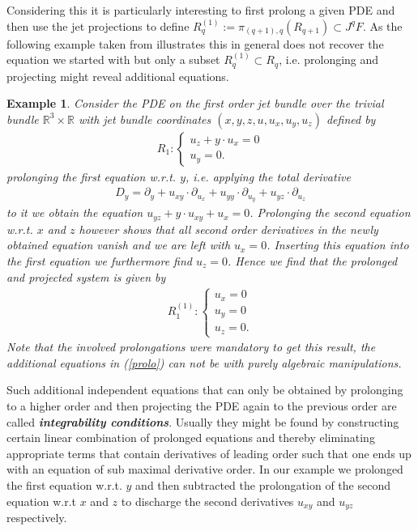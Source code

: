 \documentclass[a4paper,12pt, DIV=14, BCOR=5mm, twoside, headsepline]{scrbook}
\newtheorem{example}{Example}[chapter]
\begin{document}
Considering this it is particularly interesting to first prolong a given PDE and then use the jet projections to define $R_q^{(1)} := \pi_{(q+1),q}\left ( R_{q+1} \right ) \subset J^qF $. As the following example taken from \cite{seiler1994analysis} illustrates this in general does not recover the equation we started with but only a subset $R_q^{(1)} \subset R_q$, i.e. prolonging and projecting might reveal additional equations.
\begin{example}
Consider the PDE on the first order jet bundle over the trivial bundle $\mathbb{R}^3 \times \mathbb{R}$ with jet bundle  coordinates $(x,y,z,u,u_x,u_y,u_z)$ defined by 
\begin{align}
    R_1 : \begin{cases} u_z + y \cdot u_x = 0 \\
                        u_y = 0.
            \end{cases}
\end{align}
prolonging the first equation w.r.t. $y$, i.e. applying the total derivative 
\begin{align}
D_y = \partial_y + u_{xy} \cdot \partial_{u_x} + u_{yy} \cdot \partial_{u_y} + u_{yz} \cdot \partial_{u_z}
\end{align}
to it we obtain the equation $u_{yz} + y \cdot u_{xy} + u_x =0$. Prolonging the second equation w.r.t. $x$ and $z$ however shows that all second order derivatives in the newly obtained equation vanish and we are left with $u_x = 0$. Inserting this equation into the first equation we furthermore find $u_z = 0$. Hence we find that the prolonged and projected system is given by 
\begin{align}\label{prolo}
    R_1^{(1)} : \begin{cases} u_x = 0 \\
                        u_y = 0\\
                        u_z = 0 .
            \end{cases}
\end{align}
Note that the involved prolongations were mandatory to get this result, the additional equations in (\ref{prolo})  can not be with purely algebraic manipulations. 
\end{example}
Such additional independent equations that can only be obtained by prolonging to a higher order and then projecting the PDE again to the previous order are called \textit{\textbf{integrability conditions}}. 
Usually they might be found by constructing certain linear combination of prolonged equations and thereby eliminating appropriate terms that contain derivatives of leading order such that one ends up with an equation of sub maximal derivative order. In our example we prolonged the first equation w.r.t. $y$ and then subtracted the prolongation of the second equation w.r.t $x$ and $z$ to discharge the second derivatives $u_{xy}$ and $u_{yz}$ respectively. \\
\end{document}
